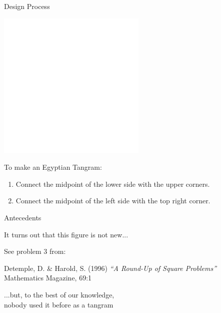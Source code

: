 \documentclass[14pt]{beamer}
\begin{document}
    \begin{frame}{Design Process}
        \begin{center}
            \includegraphics[height=18ex]{figures/figure001b.pdf}
        \end{center}

        To make an Egyptian Tangram:

        {\small \begin{enumerate}
            \item Connect the midpoint of the lower side with the upper corners.
            \item Connect the midpoint of the left side with the top right corner.
        \end{enumerate}}
    \end{frame}


    \begin{frame}{Antecedents}
        \begin{center}
            It turns out that this figure is not new...

            \bigskip \bigskip \bigskip

            {\small See problem 3 from:}

            \medskip

            {\footnotesize Detemple, D. \& Harold, S. (1996) \emph{``A Round-Up of Square Problems''} Mathematics Magazine, 69:1}
            
            \bigskip \bigskip \bigskip
        
            ...but, to the best of our knowledge,\\nobody used it before as a tangram
        \end{center}
    \end{frame}

\end{document}
